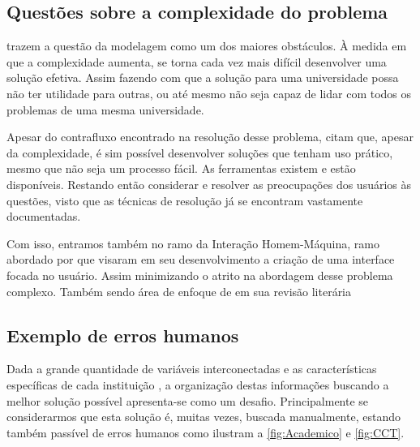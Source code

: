 \subsection{Questões sobre a complexidade do problema} \label{ssec:desafios}                                                      %


 trazem a questão da modelagem como um dos maiores obstáculos. À medida em que a complexidade aumenta, se torna cada vez mais difícil desenvolver uma solução efetiva. Assim fazendo com que a solução para uma universidade possa não ter utilidade para outras, ou até mesmo não seja capaz de lidar com todos os problemas de uma mesma universidade.

Apesar do contrafluxo encontrado na resolução desse problema,  citam que, apesar da complexidade, é sim possível desenvolver soluções que tenham uso prático, mesmo que não seja um processo fácil. As ferramentas existem e estão disponíveis. Restando então considerar e resolver as preocupações dos usuários às questões, visto que as técnicas de resolução já se encontram vastamente documentadas.

Com isso, entramos também no ramo da Interação Homem-Máquina, ramo abordado por  que visaram em seu desenvolvimento a criação de uma interface focada no usuário. Assim minimizando o atrito na abordagem desse problema complexo. Também sendo área de enfoque de  em sua revisão literária

\subsection{Exemplo de erros humanos} \label{ssec:erros}                                                    %

Dada a grande quantidade de variáveis interconectadas e as características específicas de cada instituição \cite{miranda_udpskeduler_2012}, a organização destas informações buscando a melhor solução possível apresenta-se como um desafio. Principalmente se considerarmos que esta solução é, muitas vezes, buscada manualmente, estando também passível de erros humanos como ilustram a \autoref{fig:Academico} e \autoref{fig:CCT}.

